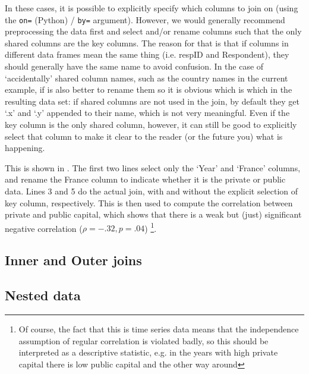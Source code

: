In these cases, it is possible to explicitly specify which columns to join on (using the \verb+on=+ (Python) / \verb+by=+ argument).
However, we would generally recommend preprocessing the data first and select and/or rename columns such that the only shared columns are the key columns.
The reason for that is that if columns in different data frames mean the same thing (i.e. respID and Respondent), they should generally have the same name to avoid confusion.
In the case of `accidentally' shared column names, such as the country names in the current example,
if is also better to rename them so it is obvious which is which in the resulting data set:
if shared columns are not used in the join, by default they get `.x' and `.y' appended to their name, which is not very meaningful.
Even if the key column is the only shared column, however, it can still be good to explicitly select that column to make it clear to the reader (or the future you) what is happening. 


This is shown in .
The first two lines select only the `Year' and `France' columns, and rename the France column to indicate whether it is the private or public data.
Lines 3 and 5 do the actual join, with and without the explicit selection of key column, respectively.
This is then used to compute the correlation between private and public capital, 
which shows that there is a weak but (just) significant negative correlation ($\rho=-.32, p=.04$)%
\footnote{Of course, the fact that this is time series data means that the independence assumption of regular correlation is violated badly, so this should be interpreted as a descriptive statistic, e.g. in the years with high private capital there is low public capital and the other way around}.

\subsection{Inner and Outer joins}

\subsection{Nested data}

